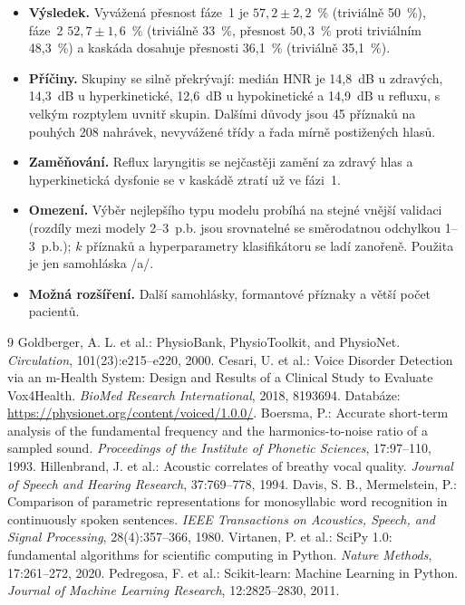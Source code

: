 \documentclass[11pt,a4paper]{article}
\begin{document}
\begin{itemize}
  \item \textbf{Výsledek.} Vyvážená přesnost fáze~1 je $57{,}2 \pm 2{,}2$~\% (triviálně 50~\%), fáze~2
        $52{,}7 \pm 1{,}6$~\% (triviálně 33~\%, přesnost $50{,}3$~\% proti triviálním 48,3~\%) a kaskáda
        dosahuje přesnosti 36,1~\% (triviálně 35,1~\%).
  \item \textbf{Příčiny.} Skupiny se silně překrývají: medián HNR je 14,8~dB u zdravých, 14,3~dB
        u hyperkinetické, 12,6~dB u hypokinetické a 14,9~dB u refluxu, s velkým rozptylem uvnitř
        skupin. Dalšími důvody jsou 45 příznaků na pouhých 208 nahrávek, nevyvážené třídy a řada
        mírně postižených hlasů.
  \item \textbf{Zaměňování.} Reflux laryngitis se nejčastěji zamění za zdravý hlas a hyperkinetická
        dysfonie se v kaskádě ztratí už ve fázi~1.
  \item \textbf{Omezení.} Výběr nejlepšího typu modelu probíhá na stejné vnější validaci (rozdíly
        mezi modely 2--3~p.b. jsou srovnatelné se směrodatnou odchylkou 1--3~p.b.); $k$ příznaků
        a hyperparametry klasifikátoru se ladí zanořeně. Použita je jen samohláska /a/.
  \item \textbf{Možná rozšíření.} Další samohlásky, formantové příznaky a větší počet pacientů.
\end{itemize}

\begin{thebibliography}{9}
 Goldberger, A. L. et al.: PhysioBank, PhysioToolkit, and PhysioNet.
  \emph{Circulation}, 101(23):e215--e220, 2000.
 Cesari, U. et al.: Voice Disorder Detection via an m-Health System: Design and
  Results of a Clinical Study to Evaluate Vox4Health. \emph{BioMed Research International},
  2018, 8193694. Databáze: \url{https://physionet.org/content/voiced/1.0.0/}.
 Boersma, P.: Accurate short-term analysis of the fundamental frequency and the
  harmonics-to-noise ratio of a sampled sound. \emph{Proceedings of the Institute of Phonetic
  Sciences}, 17:97--110, 1993.
 Hillenbrand, J. et al.: Acoustic correlates of breathy vocal quality.
  \emph{Journal of Speech and Hearing Research}, 37:769--778, 1994.
 Davis, S. B., Mermelstein, P.: Comparison of parametric representations for
  monosyllabic word recognition in continuously spoken sentences. \emph{IEEE Transactions on
  Acoustics, Speech, and Signal Processing}, 28(4):357--366, 1980.
 Virtanen, P. et al.: SciPy 1.0: fundamental algorithms for scientific computing
  in Python. \emph{Nature Methods}, 17:261--272, 2020.
 Pedregosa, F. et al.: Scikit-learn: Machine Learning in Python.
  \emph{Journal of Machine Learning Research}, 12:2825--2830, 2011.
\end{thebibliography}
\end{document}
